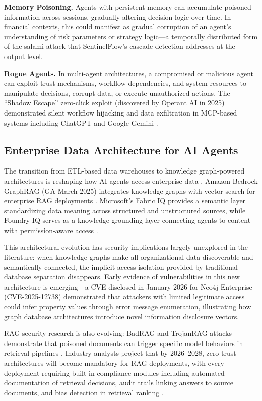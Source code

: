 \documentclass[12pt,a4paper]{article}
\begin{document}
\textbf{Memory Poisoning.} Agents with persistent memory can accumulate poisoned information across sessions, gradually altering decision logic over time. In financial contexts, this could manifest as gradual corruption of an agent's understanding of risk parameters or strategy logic---a temporally distributed form of the salami attack that SentinelFlow's cascade detection addresses at the output level.

\textbf{Rogue Agents.} In multi-agent architectures, a compromised or malicious agent can exploit trust mechanisms, workflow dependencies, and system resources to manipulate decisions, corrupt data, or execute unauthorized actions. The ``Shadow Escape'' zero-click exploit (discovered by Operant AI in 2025) demonstrated silent workflow hijacking and data exfiltration in MCP-based systems including ChatGPT and Google Gemini \cite{aimultiple_agent_threats}.

\subsection{Enterprise Data Architecture for AI Agents}

The transition from ETL-based data warehouses to knowledge graph-powered architectures is reshaping how AI agents access enterprise data \cite{graphwise_enterprise_ai_2026, ms_financial_ai_2026}. Amazon Bedrock GraphRAG (GA March 2025) integrates knowledge graphs with vector search for enterprise RAG deployments \cite{aws_graphrag_2025}. Microsoft's Fabric IQ provides a semantic layer standardizing data meaning across structured and unstructured sources, while Foundry IQ serves as a knowledge grounding layer connecting agents to content with permission-aware access \cite{ms_financial_ai_2026}.

This architectural evolution has security implications largely unexplored in the literature: when knowledge graphs make all organizational data discoverable and semantically connected, the implicit access isolation provided by traditional database separation disappears. Early evidence of vulnerabilities in this new architecture is emerging---a CVE disclosed in January 2026 for Neo4j Enterprise (CVE-2025-12738) demonstrated that attackers with limited legitimate access could infer property values through error message enumeration, illustrating how graph database architectures introduce novel information disclosure vectors.

RAG security research is also evolving: BadRAG and TrojanRAG attacks demonstrate that poisoned documents can trigger specific model behaviors in retrieval pipelines \cite{nstarx_rag_evolution_2026}. Industry analysts project that by 2026--2028, zero-trust architectures will become mandatory for RAG deployments, with every deployment requiring built-in compliance modules including automated documentation of retrieval decisions, audit trails linking answers to source documents, and bias detection in retrieval ranking \cite{nstarx_rag_evolution_2026}.
\end{document}
